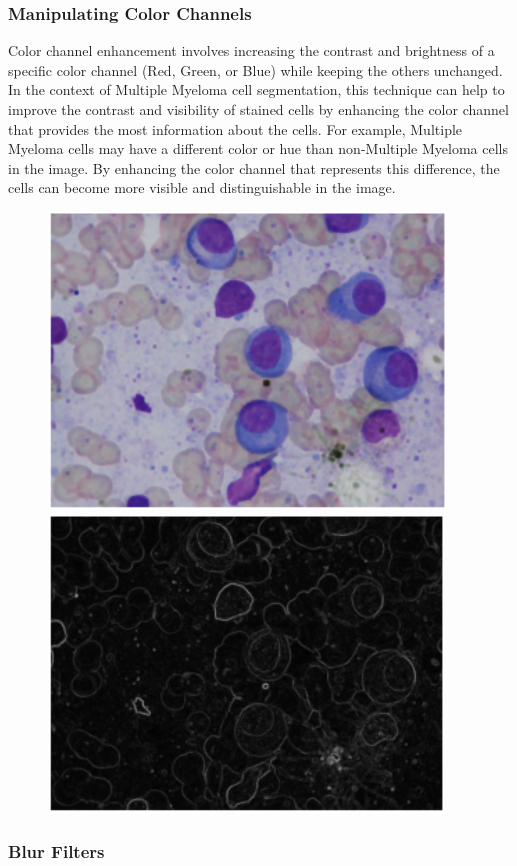 \documentclass{article}
\begin{document}
\subsubsection{Manipulating Color Channels}

Color channel enhancement involves increasing the contrast and brightness of a specific color channel (Red, Green, or Blue) while keeping the others unchanged. In the context of Multiple Myeloma cell segmentation, this technique can help to improve the contrast and visibility of stained cells by enhancing the color channel that provides the most information about the cells. For example, Multiple Myeloma cells may have a different color or hue than non-Multiple Myeloma cells in the image. By enhancing the color channel that represents this difference, the cells can become more visible and distinguishable in the image.

\begin{figure}
  \centering
  \begin{minipage}{.5\textwidth}
    \centering
    \includegraphics[width=.4\linewidth]{5.png}
  \end{minipage}%
  \begin{minipage}{.4\textwidth}
    \centering
    \includegraphics[width=.6\linewidth]{6.png}
  \end{minipage}
\end{figure}
\subsubsection{Blur Filters}
\end{document}
